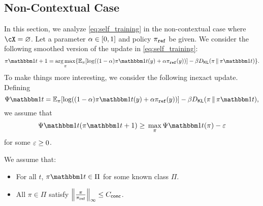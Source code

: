 \documentclass{article}
\begin{document}
  \subsection{Non-Contextual Case}
  \newcommand{\sm}{\alpha}
  \newcommand{\ystar}{y^{\star}}
  \newcommand{\ones}{\mb{1}}
In this section, we analyze \cref{eq:self_training} in the
non-contextual case where $\cX=\emptyset$. Let a parameter
$\sm\in\brk{0,1}$ and policy $\piref$ be given. We consider the following smoothed version
of the update in \cref{eq:self_training}:
\begin{align}
  \pi\ind{t+1}=\argmax_{\pi}\crl*{
  \En_{\pi}\brk*{\log\prn*{(1-\alpha)\pi\ind{t}(y)+\alpha\piref(y)}}
  -\beta\Dkl{\pi}{\pi\ind{t}}
  }.
\end{align}
To make things more interesting, we consider the following inexact
update. Defining
\[
\Psi\ind{t} =   \En_{\pi}\brk*{\log\prn*{(1-\alpha)\pi\ind{t}(y)+\alpha\piref(y)}}
  -\beta\Dkl{\pi}{\pi\ind{t}},
\]
we assume that
\begin{align}
  \label{eq:pit}
\Psi\ind{t}(\pi\ind{t+1})\geq{}\max_{\pi}\Psi\ind{t}(\pi) - \veps
\end{align}
for some $\veps\geq{}0$.
\begin{assumption} We assume that:
  \begin{itemize}
  \item For all $t$, $\pi\ind{t}\in\Pi$ for some known class $\Pi$.
  \item All $\pi\in\Pi$ satisfy $\nrm*{\frac{\pi}{\piref}}_{\infty}\leq{}\Cconc$.
  \end{itemize}
  
\end{assumption}

\begin{theorem}
  \label{thm:bandit}
  
\end{theorem}
\end{document}
